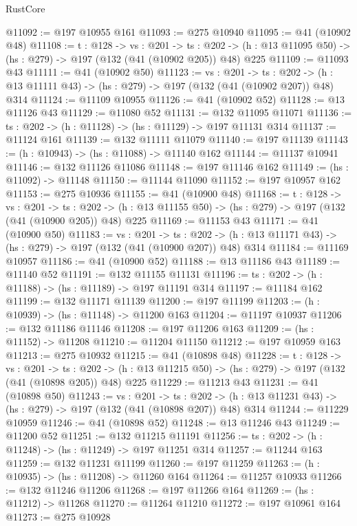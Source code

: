 \begin{lexlean}{RustCore}
\begin{coremodule}
@11092 := @197 @10955 @161
@11093 := @275 @10940
@11095 := @41 (@10902 @48)
@11108 := {t : @128} ->
  {vs : @201} ->
  {ts : @202} -> (h : @13 @11095 @50) -> (hs : @279) -> @197 (@132 (@41 (@10902 @205)) @48) @225
@11109 := @11093 @43
@11111 := @41 (@10902 @50)
@11123 := {vs : @201} ->
  {ts : @202} -> (h : @13 @11111 @43) -> (hs : @279) -> @197 (@132 (@41 (@10902 @207)) @48) @314
@11124 := @11109 @10955
@11126 := @41 (@10902 @52)
@11128 := @13 @11126 @43
@11129 := @11080 @52
@11131 := @132 @11095 @11071
@11136 := {ts : @202} -> (h : @11128) -> (hs : @11129) -> @197 @11131 @314
@11137 := @11124 @161
@11139 := @132 @11111 @11079
@11140 := @197 @11139
@11143 := (h : @10943) -> (hs : @11088) -> @11140 @162
@11144 := @11137 @10941
@11146 := @132 @11126 @11086
@11148 := @197 @11146 @162
@11149 := (hs : @11092) -> @11148
@11150 := @11144 @11090
@11152 := @197 @10957 @162
@11153 := @275 @10936
@11155 := @41 (@10900 @48)
@11168 := {t : @128} ->
  {vs : @201} ->
  {ts : @202} -> (h : @13 @11155 @50) -> (hs : @279) -> @197 (@132 (@41 (@10900 @205)) @48) @225
@11169 := @11153 @43
@11171 := @41 (@10900 @50)
@11183 := {vs : @201} ->
  {ts : @202} -> (h : @13 @11171 @43) -> (hs : @279) -> @197 (@132 (@41 (@10900 @207)) @48) @314
@11184 := @11169 @10957
@11186 := @41 (@10900 @52)
@11188 := @13 @11186 @43
@11189 := @11140 @52
@11191 := @132 @11155 @11131
@11196 := {ts : @202} -> (h : @11188) -> (hs : @11189) -> @197 @11191 @314
@11197 := @11184 @162
@11199 := @132 @11171 @11139
@11200 := @197 @11199
@11203 := (h : @10939) -> (hs : @11148) -> @11200 @163
@11204 := @11197 @10937
@11206 := @132 @11186 @11146
@11208 := @197 @11206 @163
@11209 := (hs : @11152) -> @11208
@11210 := @11204 @11150
@11212 := @197 @10959 @163
@11213 := @275 @10932
@11215 := @41 (@10898 @48)
@11228 := {t : @128} ->
  {vs : @201} ->
  {ts : @202} -> (h : @13 @11215 @50) -> (hs : @279) -> @197 (@132 (@41 (@10898 @205)) @48) @225
@11229 := @11213 @43
@11231 := @41 (@10898 @50)
@11243 := {vs : @201} ->
  {ts : @202} -> (h : @13 @11231 @43) -> (hs : @279) -> @197 (@132 (@41 (@10898 @207)) @48) @314
@11244 := @11229 @10959
@11246 := @41 (@10898 @52)
@11248 := @13 @11246 @43
@11249 := @11200 @52
@11251 := @132 @11215 @11191
@11256 := {ts : @202} -> (h : @11248) -> (hs : @11249) -> @197 @11251 @314
@11257 := @11244 @163
@11259 := @132 @11231 @11199
@11260 := @197 @11259
@11263 := (h : @10935) -> (hs : @11208) -> @11260 @164
@11264 := @11257 @10933
@11266 := @132 @11246 @11206
@11268 := @197 @11266 @164
@11269 := (hs : @11212) -> @11268
@11270 := @11264 @11210
@11272 := @197 @10961 @164
@11273 := @275 @10928

\end{coremodule}
\end{lexlean}
